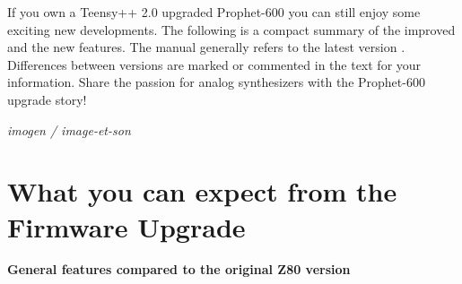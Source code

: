 \documentclass[landscape, 11pt, oneside, twoside]{report}
\newenvironment{flowtext}{\addmargin[0cm]{0cm}}{\endaddmargin} %
\begin{document}
\begin{flowtext}
If you own a Teensy++ 2.0 upgraded Prophet-600 you can still enjoy some exciting new developments. The following is a compact summary of the improved and the new features. The manual generally refers to the latest version \version. Differences between versions are marked or commented in the text for your information. Share the passion for analog synthesizers with the Prophet-600 upgrade story!  

\begin{flushright}
  \textit{imogen / image-et-son}
\end{flushright}

\pagebreak
\section{What you can expect from the Firmware Upgrade}

\textbf{General features compared to the original Z80 version}
  

\end{flowtext}
\end{document}
